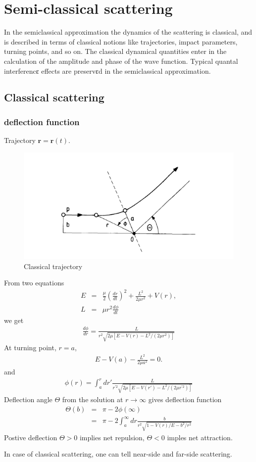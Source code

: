 \documentclass[10pt]{book}
\def\bm{\boldsymbol}
\newcommand{\bea}{\begin{eqnarray}}
\newcommand{\eea}{\end{eqnarray}}
\newcommand{\no}{\nonumber \\}
\def\vr{{\bm r}}
\begin{document}
\chapter{Semi-classical scattering}
In the semiclassical approximation the dynamics of the scattering is classical, and is
described in terms of classical notions like trajectories, impact parameters, turning points,
and so on. The classical dynamical quantities enter in the calculation of the amplitude
and phase of the wave function. Typical quantal interferencε effects are preservεd in the
semiclassical approximation. 

\section{Classical scattering}
\subsection{deflection function} 
Trajectory $\vr=\vr(t)$. 

\begin{figure}
	\centering
	\includegraphics[width=0.7\linewidth]{figs/classical_scattering}
	\caption[Classical trajectory]{Classical trajectory}
	\label{fig:classicalscattering}
\end{figure}
From two equations
\bea 
E&=&\frac{\mu}{2}(\frac{dr}{dt})^2+\frac{L^2}{2\mu r^2}+V(r),\no 
L&=&\mu r^2\frac{d\phi}{dt}
\eea 
we get
\bea 
\frac{d\phi}{dr}=\frac{L}{r^2\sqrt{2\mu[E-V(r)-L^2/(2\mu r^2)]}}
\eea 
At turning point, $r=a$,
\bea 
E-V(a)-\frac{L^2}{2\mu a^2} =0.
\eea 
and 
\bea 
\phi(r)=\int_a^r dr' \frac{L}{r^{'2} \sqrt{2\mu[E-V(r')-L^2/(2\mu r^{'2})]}   }
\eea 
Deflection angle $\Theta$ from the solution at $r\to\infty$ gives deflection function 
\bea 
\Theta(b)&=&\pi-2\phi(\infty) \no 
         &=&\pi-2\int_a^\infty dr \frac{b}{r^{2} \sqrt{1-V(r)/E-b^2/r^2}}    
\eea 
Postive deflection $\Theta>0$ implies net repulsion, $\Theta<0$ imples net attraction. 

In case of classical scattering, one can tell near-side and far-side scattering. 
\end{document}
